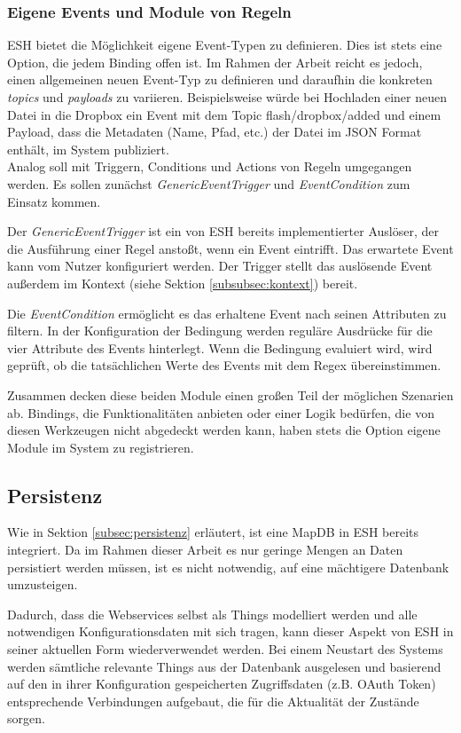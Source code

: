 \subsubsection{Eigene Events und Module von Regeln}
ESH bietet die Möglichkeit eigene Event-Typen zu definieren. Dies ist stets eine Option, die jedem Binding offen ist. Im Rahmen der Arbeit reicht es jedoch, einen allgemeinen neuen Event-Typ zu definieren und daraufhin die konkreten \textit{topics} und \textit{payloads} zu variieren. Beispielsweise würde bei Hochladen einer neuen Datei in die Dropbox ein Event mit dem Topic \glqq flash/dropbox/added\grqq{} und einem Payload, dass die Metadaten (Name, Pfad, etc.) der Datei im JSON Format enthält, im System publiziert.\\

Analog soll mit Triggern, Conditions und Actions von Regeln umgegangen werden. Es sollen zunächst \textit{GenericEventTrigger} und \textit{EventCondition} zum Einsatz kommen. 

Der \textit{GenericEventTrigger} ist ein von ESH bereits implementierter Auslöser, der die Ausführung einer Regel anstoßt, wenn ein Event eintrifft. Das erwartete Event kann vom Nutzer konfiguriert werden. Der Trigger stellt das auslösende Event außerdem im Kontext (siehe Sektion \ref{subsubsec:kontext}) bereit.

Die \textit{EventCondition} ermöglicht es das erhaltene Event nach seinen Attributen zu filtern. In der Konfiguration der Bedingung werden reguläre Ausdrücke für die vier Attribute des Events hinterlegt. Wenn die Bedingung evaluiert wird, wird geprüft, ob die tatsächlichen Werte des Events mit dem Regex übereinstimmen. 

Zusammen decken diese beiden Module einen großen Teil der möglichen Szenarien ab. Bindings, die Funktionalitäten anbieten oder einer Logik bedürfen, die von diesen Werkzeugen nicht abgedeckt werden kann, haben stets die Option eigene Module im System zu registrieren.




\subsection{Persistenz}
Wie in Sektion \ref{subsec:persistenz} erläutert, ist eine MapDB in ESH bereits integriert. Da im Rahmen dieser Arbeit es nur geringe Mengen an Daten persistiert werden müssen, ist es nicht notwendig, auf eine mächtigere Datenbank umzusteigen. 

Dadurch, dass die Webservices selbst als Things modelliert werden und alle notwendigen Konfigurationsdaten mit sich tragen, kann dieser Aspekt von ESH in seiner aktuellen Form wiederverwendet werden. Bei einem Neustart des Systems werden sämtliche relevante Things aus der Datenbank ausgelesen und basierend auf den in ihrer Konfiguration gespeicherten Zugriffsdaten (z.B. OAuth Token) entsprechende Verbindungen aufgebaut, die für die Aktualität der Zustände sorgen.


